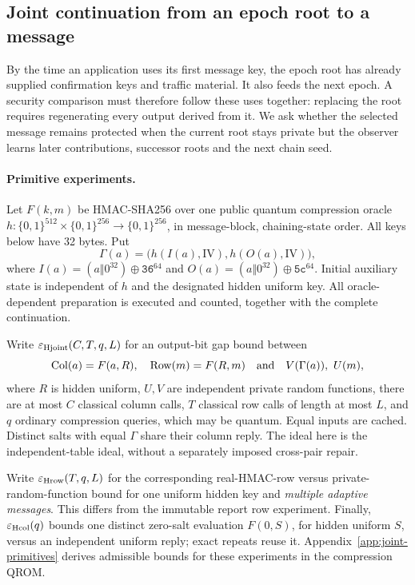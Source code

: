 \documentclass[pdflatex]{sn-jnl}
\theoremstyle{thmstyleone}
\theoremstyle{thmstylethree}
\theoremstyle{thmstyletwo}
\begin{document}
\subsection{Joint continuation from an epoch root to a message}
\label{sec:joint-continuation}

By the time an application uses its first message key, the epoch root
has already supplied confirmation keys and traffic material. It also
feeds the next epoch. A security comparison must therefore follow these
uses together: replacing the root requires regenerating every output
derived from it. We ask whether the selected message remains protected
when the current root stays private but the observer learns later
contributions, successor roots and the next chain seed.

\paragraph{Primitive experiments.}
Let $F(k,m)$ be HMAC-SHA256 over one public quantum compression oracle
$h:\{0,1\}^{512}\times\{0,1\}^{256}\to\{0,1\}^{256}$, in message-block,
chaining-state order. All keys below have 32 bytes. Put
\[
 \Gamma(a)=\bigl(h(I(a),\mathrm{IV}),h(O(a),\mathrm{IV})\bigr),
\]
where $I(a)=(a\Vert0^{32})\oplus\mathtt{36}^{64}$ and
$O(a)=(a\Vert0^{32})\oplus\mathtt{5c}^{64}$.
Initial auxiliary state is independent of $h$ and the designated hidden
uniform key. All oracle-dependent preparation is executed and counted,
together with the complete continuation.

Write $\varepsilon_{\rm Hjoint}(C,T,q,L)$ for an output-bit gap bound between
\[
 \operatorname{Col}(a)=F(a,R),\quad
 \operatorname{Row}(m)=F(R,m)
 \quad\hbox{and}\quad
 V(\Gamma(a)),\ U(m),
\]
where $R$ is hidden uniform, $U,V$ are independent private random functions,
there are at most $C$ classical column calls, $T$ classical row calls of
length at most $L$, and $q$ ordinary compression queries, which may be
quantum. Equal inputs are cached. Distinct salts with equal $\Gamma$ share
their column reply. The ideal here is the independent-table ideal, without
a separately imposed cross-pair repair.

Write $\varepsilon_{\rm Hrow}(T,q,L)$ for the corresponding real-HMAC-row
versus private-random-function bound for one uniform hidden key and
\emph{multiple adaptive messages}. This differs from the immutable report
row experiment. Finally, $\varepsilon_{\rm Hcol}(q)$ bounds one distinct
zero-salt evaluation $F(0,S)$, for hidden uniform $S$, versus an independent
uniform reply; exact repeats reuse it. Appendix~\ref{app:joint-primitives}
derives admissible bounds for these experiments in the compression QROM.
\end{document}
